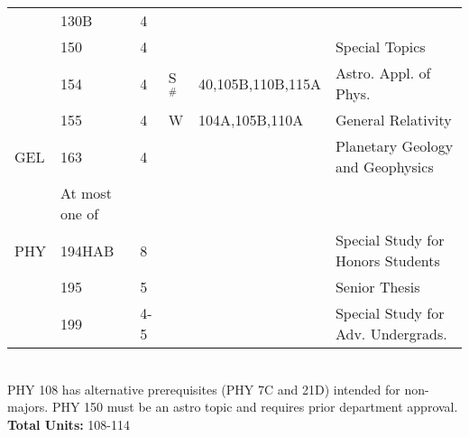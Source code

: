 \documentclass[12pt]{article}
\begin{document}
\begin{tabular}{|llllll|}
    & 130B & 4 &  &  & \\  
    & 150  & 4 &  &  & Special Topics\\  
    & 154  & 4 & S$^\#$ & 40,105B,110B,115A & Astro. Appl. of Phys. \\
    & 155  & 4 & W   & 104A,105B,110A & General Relativity \\ 
GEL & 163  & 4 &  &  & Planetary Geology and Geophysics\\ 
 & At most one of &  &  &  & \\ 
PHY & 194HAB & 8 &  &  & Special Study for Honors Students\\ 
    & 195  & 5 &  &  & Senior Thesis\\ 
    & 199  & 4-5 &  &  & Special Study for Adv. Undergrads.\\ 
\hline
\end{tabular}\\
\vskip 0.25cm
\noindent
PHY 108 has alternative prerequisites (PHY 7C and 21D)
intended for non-majors.  PHY 150 must be an astro topic and requires
prior department approval.\\
\noindent
{\bf Total Units:} 108-114 \\
\end{document}
